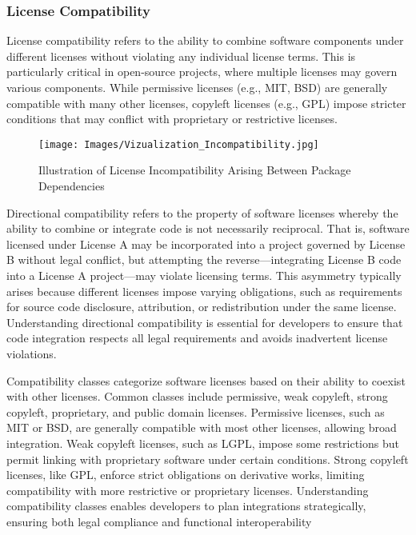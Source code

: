 \subsubsection{License Compatibility}

License compatibility refers to the ability to combine software components under different licenses without violating any individual license terms. This is particularly critical in open-source projects, where multiple licenses may govern various components. While permissive licenses (e.g., MIT, BSD) are generally compatible with many other licenses, copyleft licenses (e.g., GPL) impose stricter conditions that may conflict with proprietary or restrictive licenses.


\begin{figure*}[!t]
    \centering
    \texttt{[image: Images/Vizualization\_Incompatibility.jpg]}
    \caption{Illustration of License Incompatibility Arising Between Package Dependencies}
    \label{fig:Viz_Incompatibility}
\end{figure*}



Directional compatibility refers to the property of software licenses whereby the ability to combine or integrate code is not necessarily reciprocal. That is, software licensed under License A may be incorporated into a project governed by License B without legal conflict, but attempting the reverse—integrating License B code into a License A project—may violate licensing terms. This asymmetry typically arises because different licenses impose varying obligations, such as requirements for source code disclosure, attribution, or redistribution under the same license. Understanding directional compatibility is essential for developers to ensure that code integration respects all legal requirements and avoids inadvertent license violations.

Compatibility classes categorize software licenses based on their ability to coexist with other licenses. Common classes include permissive, weak copyleft, strong copyleft, proprietary, and public domain licenses. Permissive licenses, such as MIT or BSD, are generally compatible with most other licenses, allowing broad integration. Weak copyleft licenses, such as LGPL, impose some restrictions but permit linking with proprietary software under certain conditions. Strong copyleft licenses, like GPL, enforce strict obligations on derivative works, limiting compatibility with more restrictive or proprietary licenses. Understanding compatibility classes enables developers to plan integrations strategically, ensuring both legal compliance and functional interoperability







